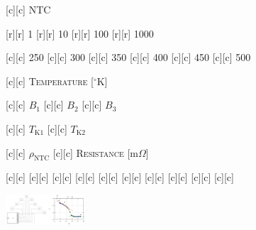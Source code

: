 [c][c] {\scriptsize \textsc{NTC}}

[r][r] {\tiny 1}
[r][r] {\tiny 10}
[r][r] {\tiny 100}
[r][r] {\tiny 1000}

[c][c] {\tiny 250}
[c][c] {\tiny 300}
[c][c] {\tiny 350}
[c][c] {\tiny 400}
[c][c] {\tiny 450}
[c][c] {\tiny 500}

[c][c] {\scriptsize \textsc{Temperature} [$^{\circ}$K]}

[c][c] {\tiny $B_{1}$}
[c][c] {\tiny $B_{2}$}
[c][c] {\tiny $B_{3}$}

[c][c] {\tiny $T_{\text{K1}}$}
[c][c] {\tiny $T_{\text{K2}}$}

[c][c] {\tiny $\rho_{\text{NTC}}$}
[c][c] {\tiny \textsc{Resistance} [m$\Omega$]}

[c][c] {}
[c][c] {}
[c][c] {}
[c][c] {}
[c][c] {}
[c][c] {}
[c][c] {}
[c][c] {}
[c][c] {}
[c][c] {}

\includegraphics[width=0.22\textwidth]{semiconductorBA.eps}